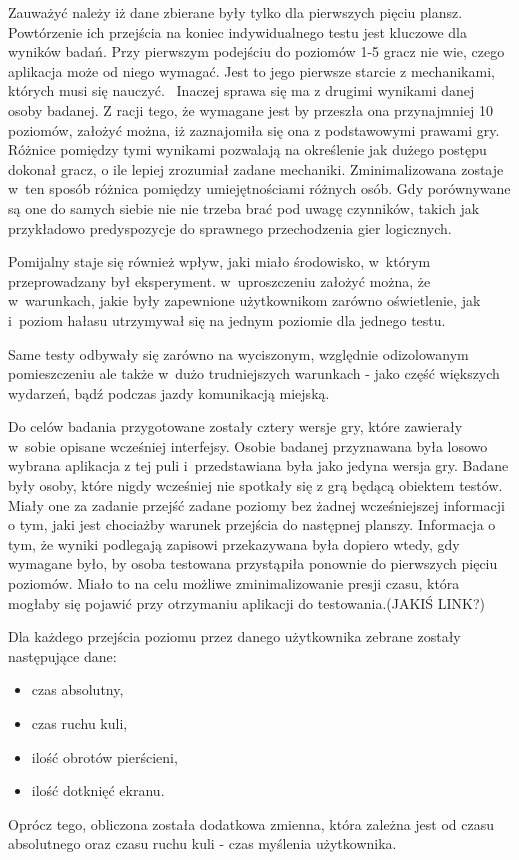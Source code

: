 \documentclass[a4paper,12pt,numbers=noenddot]{report}
\begin{document}
Zauważyć należy iż dane zbierane były tylko dla pierwszych pięciu plansz. Powtórzenie ich przejścia na koniec indywidualnego testu jest kluczowe dla wyników badań. Przy pierwszym podejściu do poziomów 1-5 gracz nie wie, czego aplikacja może od niego wymagać. Jest to jego pierwsze starcie z mechanikami, których musi się nauczyć. \
Inaczej sprawa się ma z drugimi wynikami danej osoby badanej. Z racji tego, że wymagane jest by przeszła ona przynajmniej 10 poziomów, założyć można, iż zaznajomiła się ona z podstawowymi prawami gry. Różnice pomiędzy tymi wynikami pozwalają na określenie jak dużego postępu dokonał gracz, o ile lepiej zrozumiał zadane mechaniki. Zminimalizowana zostaje w~ten sposób różnica pomiędzy umiejętnościami różnych osób. Gdy porównywane są one do samych siebie nie nie trzeba brać pod uwagę czynników, takich jak przykładowo predyspozycje do sprawnego przechodzenia gier logicznych.

Pomijalny staje się również wpływ, jaki miało środowisko, w~którym przeprowadzany był eksperyment. w~uproszczeniu założyć można, że w~warunkach, jakie były zapewnione użytkownikom zarówno oświetlenie, jak i~poziom hałasu utrzymywał się na jednym poziomie dla jednego testu.

Same testy odbywały się zarówno na wyciszonym, względnie odizolowanym pomieszczeniu ale także w~dużo trudniejszych warunkach - jako część większych wydarzeń, bądź podczas jazdy komunikacją miejską. 

Do celów badania przygotowane zostały cztery wersje gry, które zawierały w~sobie opisane wcześniej interfejsy. Osobie badanej przyznawana była losowo wybrana aplikacja z tej puli i~przedstawiana była jako jedyna wersja gry. 
Badane były osoby, które nigdy wcześniej nie spotkały się z grą będącą obiektem testów. Miały one za zadanie przejść zadane poziomy bez żadnej wcześniejszej informacji o tym, jaki jest chociażby warunek przejścia do następnej planszy. Informacja o tym, że wyniki podlegają zapisowi przekazywana była dopiero wtedy, gdy wymagane było, by osoba testowana przystąpiła ponownie do pierwszych pięciu poziomów. Miało to na celu możliwe zminimalizowanie presji czasu, która mogłaby się pojawić przy otrzymaniu aplikacji do testowania.(JAKIŚ LINK?)

Dla każdego przejścia poziomu przez danego użytkownika zebrane zostały następujące dane:
\begin{itemize}
\item czas absolutny, 
\item czas ruchu kuli,
\item ilość obrotów pierścieni,
\item ilość dotknięć ekranu.
\end{itemize}
Oprócz tego, obliczona została dodatkowa zmienna, która zależna jest od czasu absolutnego oraz czasu ruchu kuli - czas myślenia użytkownika.
\end{document}

